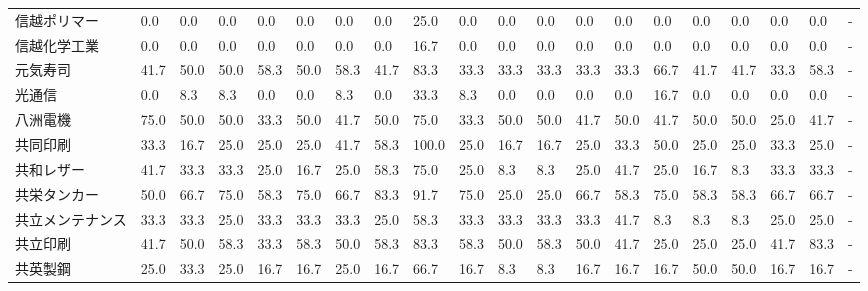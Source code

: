 \begin{tabular}{llllllllllllllllllll}
信越ポリマー          &    0.0 &    0.0 &       0.0 &       0.0 &        0.0 &    0.0 &    0.0 &   25.0 &     0.0 &     0.0 &    0.0 &   0.0 &    0.0 &     0.0 &     0.0 &   0.0 &   0.0 &   0.0 &     - \\
信越化学工業          &    0.0 &    0.0 &       0.0 &       0.0 &        0.0 &    0.0 &    0.0 &   16.7 &     0.0 &     0.0 &    0.0 &   0.0 &    0.0 &     0.0 &     0.0 &   0.0 &   0.0 &   0.0 &     - \\
元気寿司            &   41.7 &   50.0 &      50.0 &      58.3 &       50.0 &   58.3 &   41.7 &   83.3 &    33.3 &    33.3 &   33.3 &  33.3 &   33.3 &    66.7 &    41.7 &  41.7 &  33.3 &  58.3 &     - \\
光通信             &    0.0 &    8.3 &       8.3 &       0.0 &        0.0 &    8.3 &    0.0 &   33.3 &     8.3 &     0.0 &    0.0 &   0.0 &    0.0 &    16.7 &     0.0 &   0.0 &   0.0 &   0.0 &     - \\
八洲電機            &   75.0 &   50.0 &      50.0 &      33.3 &       50.0 &   41.7 &   50.0 &   75.0 &    33.3 &    50.0 &   50.0 &  41.7 &   50.0 &    41.7 &    50.0 &  50.0 &  25.0 &  41.7 &     - \\
共同印刷            &   33.3 &   16.7 &      25.0 &      25.0 &       25.0 &   41.7 &   58.3 &  100.0 &    25.0 &    16.7 &   16.7 &  25.0 &   33.3 &    50.0 &    25.0 &  25.0 &  33.3 &  25.0 &     - \\
共和レザー           &   41.7 &   33.3 &      33.3 &      25.0 &       16.7 &   25.0 &   58.3 &   75.0 &    25.0 &     8.3 &    8.3 &  25.0 &   41.7 &    25.0 &    16.7 &   8.3 &  33.3 &  33.3 &     - \\
共栄タンカー          &   50.0 &   66.7 &      75.0 &      58.3 &       75.0 &   66.7 &   83.3 &   91.7 &    75.0 &    25.0 &   25.0 &  66.7 &   58.3 &    75.0 &    58.3 &  58.3 &  66.7 &  66.7 &     - \\
共立メンテナンス        &   33.3 &   33.3 &      25.0 &      33.3 &       33.3 &   33.3 &   25.0 &   58.3 &    33.3 &    33.3 &   33.3 &  33.3 &   41.7 &     8.3 &     8.3 &   8.3 &  25.0 &  25.0 &     - \\
共立印刷            &   41.7 &   50.0 &      58.3 &      33.3 &       58.3 &   50.0 &   58.3 &   83.3 &    58.3 &    50.0 &   58.3 &  50.0 &   41.7 &    25.0 &    25.0 &  25.0 &  41.7 &  83.3 &     - \\
共英製鋼            &   25.0 &   33.3 &      25.0 &      16.7 &       16.7 &   25.0 &   16.7 &   66.7 &    16.7 &     8.3 &    8.3 &  16.7 &   16.7 &    16.7 &    50.0 &  50.0 &  16.7 &  16.7 &     - \\

\end{tabular}
